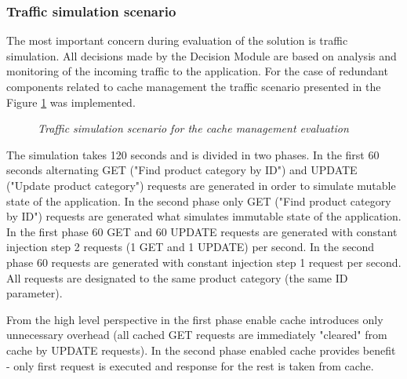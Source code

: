\documentclass[10pt,a4paper]{article}
\begin{document}
\subsubsection{Traffic simulation scenario} \label{trafficcachesim}

The most important concern during evaluation of the solution is traffic simulation. All decisions made by the Decision Module are based on analysis and monitoring of the incoming traffic to the application. For the case of redundant components related to cache management the traffic scenario presented in the Figure \ref{trafficcache} was implemented.

\begin{figure}[!htb]
\caption{\textit{Traffic simulation scenario for the cache management evaluation}} \label{trafficcache}
\end{figure}

The simulation takes 120 seconds and is divided in two phases. In the first 60 seconds alternating GET ("Find product category by ID") and UPDATE ("Update product category") requests are generated in order to simulate mutable state of the application. In the second phase only GET ("Find product category by ID") requests are generated what simulates immutable state of the application. In the first phase 60 GET and 60 UPDATE requests are generated with constant injection step 2 requests (1 GET and 1 UPDATE) per second. In the second phase 60 requests are generated with constant injection step 1 request per second. All requests are designated to the same product category (the same ID parameter). 

From the high level perspective in the first phase enable cache introduces only unnecessary overhead (all cached GET requests are immediately "cleared" from cache by UPDATE requests). In the second phase enabled cache provides benefit - only first request is executed and response for the rest is taken from cache.  
\end{document}
